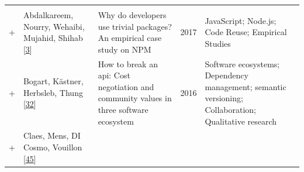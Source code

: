 \documentclass[]{book}
\begin{document}
\begin{longtable}[]{@{}lllll@{}}
\begin{minipage}[t]{0.39\columnwidth}
\strut
\end{minipage}\tabularnewline
\begin{minipage}[t]{0.01\columnwidth}\raggedright\strut
+\strut
\end{minipage} & \begin{minipage}[t]{0.09\columnwidth}\raggedright\strut
Abdalkareem, Nourry, Wehaibi, Mujahid, Shihab
{[}\protect\hyperlink{ref-Abdalkareem2017}{3}{]}\strut
\end{minipage} & \begin{minipage}[t]{0.34\columnwidth}\raggedright\strut
Why do developers use trivial packages? An empirical case study on
NPM\strut
\end{minipage} & \begin{minipage}[t]{0.02\columnwidth}\raggedright\strut
2017\strut
\end{minipage} & \begin{minipage}[t]{0.39\columnwidth}\raggedright\strut
JavaScript; Node.js; Code Reuse; Empirical Studies\strut
\end{minipage}\tabularnewline
\begin{minipage}[t]{0.01\columnwidth}\raggedright\strut
+\strut
\end{minipage} & \begin{minipage}[t]{0.09\columnwidth}\raggedright\strut
Bogart, Kästner, Herbsleb, Thung
{[}\protect\hyperlink{ref-Bogart2016}{32}{]}\strut
\end{minipage} & \begin{minipage}[t]{0.34\columnwidth}\raggedright\strut
How to break an api: Cost negotiation and community values in three
software ecosystem\strut
\end{minipage} & \begin{minipage}[t]{0.02\columnwidth}\raggedright\strut
2016\strut
\end{minipage} & \begin{minipage}[t]{0.39\columnwidth}\raggedright\strut
Software ecosystems; Dependency management; semantic versioning;
Collaboration; Qualitative research\strut
\end{minipage}\tabularnewline
\begin{minipage}[t]{0.01\columnwidth}\raggedright\strut
+\strut
\end{minipage} & \begin{minipage}[t]{0.09\columnwidth}\raggedright\strut
Claes, Mens, DI Cosmo, Vouillon
{[}\protect\hyperlink{ref-Claes2015}{45}{]}\strut
\end{minipage} & \begin{minipage}[t]{0.34\columnwidth}\raggedright\strut

\end{minipage}
\end{longtable}
\end{document}
